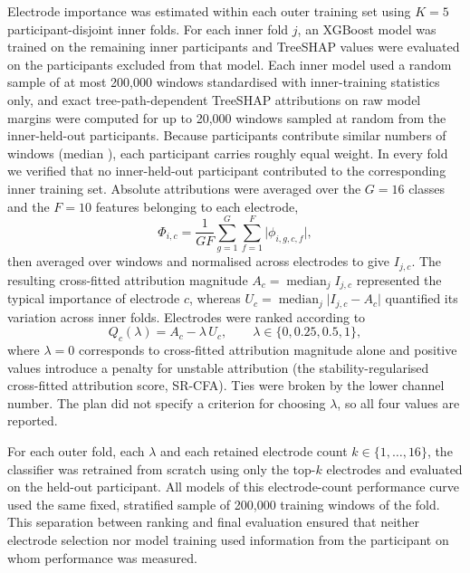 Electrode importance was estimated within each outer training set using $K = 5$ participant-disjoint inner folds. For each inner fold $j$, an XGBoost model was trained on the remaining inner participants and TreeSHAP values were evaluated on the participants excluded from that model. Each inner model used a random sample of at most 200,000 windows standardised with inner-training statistics only, and exact tree-path-dependent TreeSHAP attributions on raw model margins \citep{lundberg2020local} were computed for up to 20,000 windows sampled at random from the inner-held-out participants. Because participants contribute similar numbers of windows (median \TestWindowsPerParticipant), each participant carries roughly equal weight. In every fold we verified that no inner-held-out participant contributed to the corresponding inner training set. Absolute attributions were averaged over the $G = 16$ classes and the $F = 10$ features belonging to each electrode,
\begin{equation}
\Phi_{i,c} = \frac{1}{G F}\sum_{g=1}^{G}\sum_{f=1}^{F} \lvert \phi_{i,g,c,f} \rvert,
\end{equation}
then averaged over windows and normalised across electrodes to give $I_{j,c}$. The resulting cross-fitted attribution magnitude $A_c = \operatorname{median}_j I_{j,c}$ represented the typical importance of electrode $c$, whereas $U_c = \operatorname{median}_j \lvert I_{j,c} - A_c \rvert$ quantified its variation across inner folds. Electrodes were ranked according to
\begin{equation}
Q_c(\lambda) = A_c - \lambda\, U_c, \qquad \lambda \in \{0, 0.25, 0.5, 1\},
\label{eq:srcfa}
\end{equation}
where $\lambda = 0$ corresponds to cross-fitted attribution magnitude alone and positive values introduce a penalty for unstable attribution (the stability-regularised cross-fitted attribution score, SR-CFA). Ties were broken by the lower channel number. The plan did not specify a criterion for choosing $\lambda$, so all four values are reported.

For each outer fold, each $\lambda$ and each retained electrode count $k \in \{1, \ldots, 16\}$, the classifier was retrained from scratch using only the top-$k$ electrodes and evaluated on the held-out participant. All models of this electrode-count performance curve used the same fixed, stratified sample of 200,000 training windows of the fold. This separation between ranking and final evaluation ensured that neither electrode selection nor model training used information from the participant on whom performance was measured.

